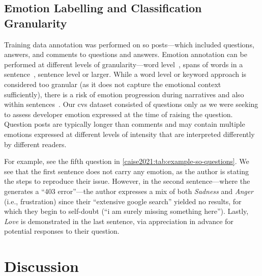 \subsection{Emotion Labelling and Classification Granularity}
Training data annotation was performed on \gls{so} posts---which included questions, answers, and comments to questions and answers.
Emotion annotation can be performed at different levels of granularity---word level~\citep{StrapparavaWordNet-Affect:WordNet}, spans of words in a sentence~\citep{Aman2007IdentifyingText}, sentence level or larger.  While a word level or keyword approach is considered too granular (as it does not capture the emotional context sufficiently), there is a risk of emotion progression during narratives and also within sentences~\citep{Aman2007IdentifyingText, murgia2014}.  Our \gls{cvs} dataset consisted of questions only as we were seeking to assess developer emotion expressed at the time of raising the question.  Question posts are typically longer than comments and may contain multiple emotions expressed at different levels of intensity that are interpreted differently by different readers.  

For example,  see the fifth question in \cref{caise2021:tab:example-so-questions}. We see that the first sentence does not carry any emotion, as the author is stating the steps to reproduce their issue. However, in the second sentence---where the  generates a ``403 error''---the author expresses a mix of both \textit{Sadness} and \textit{Anger} (i.e., frustration) since their ``extensive google search'' yielded no results, for which they begin to self-doubt (``i am surely missing something here''). Lastly, \textit{Love} is demonstrated in the last sentence, via appreciation in advance for potential responses to their question.

\section{Discussion} \label{caise2021:sec:disussion}


